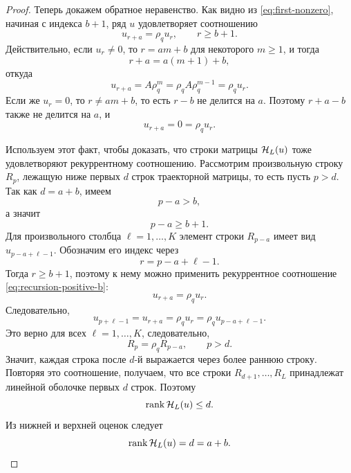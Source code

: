 \begin{proof}
Теперь докажем обратное неравенство. Как видно из \eqref{eq:first-nonzero}, начиная с индекса $b+1$, ряд $u$ удовлетворяет соотношению
\begin{equation}
    u_{r+a}=\rho_q u_r,
    \qquad r\ge b+1.
    \label{eq:recursion-positive-b}
\end{equation}
Действительно, если $u_r\ne0$, то $r=am+b$ для некоторого $m\ge1$, и тогда
\begin{equation*}
    r+a=a(m+1)+b,
\end{equation*}
откуда
\begin{equation*}
    u_{r+a}=A\rho_q^m=\rho_q A\rho_q^{m-1}=\rho_q u_r.
\end{equation*}
Если же $u_r=0$, то $r \ne am+b$, то есть $r-b$ не делится на $a$. Поэтому $r+a-b$ также не делится на $a$, и
\begin{equation*}
    u_{r+a}=0=\rho_q u_r.
\end{equation*}

Используем этот факт, чтобы доказать, что строки матрицы $\mathcal H_L(u)$ тоже
удовлетворяют рекуррентному соотношению. Рассмотрим произвольную строку $R_p$,
лежащую ниже первых $d$ строк траекторной матрицы, то есть пусть $p>d$. Так
как $d=a+b$, имеем
\begin{equation*}
    p-a>b,
\end{equation*}
а значит
\begin{equation*}
    p-a\ge b+1.
\end{equation*}
Для произвольного столбца $\ell=1,\dots,K$ элемент строки $R_{p-a}$ имеет вид $u_{p-a+\ell-1}$. Обозначим его индекс через
\begin{equation*}
    r=p-a+\ell-1.
\end{equation*}
Тогда $r\ge b+1$, поэтому к нему можно применить рекуррентное соотношение \eqref{eq:recursion-positive-b}:
\begin{equation*}
    u_{r+a}=\rho_q u_r.
\end{equation*}
Следовательно,
\begin{equation*}
    u_{p+\ell-1}
    =
    u_{r+a}
    =
    \rho_q u_r
    =
    \rho_q u_{p-a+\ell-1}.
\end{equation*}
Это верно для всех $\ell=1,\dots,K$, следовательно,
\begin{equation*}
    R_p=\rho_q R_{p-a},
    \qquad p>d.
\end{equation*}
Значит, каждая строка после $d$-й выражается через более раннюю строку.
Повторяя это соотношение, получаем, что все строки $R_{d+1},\dots,R_L$
принадлежат линейной оболочке первых $d$ строк.
Поэтому
\begin{equation*}
    \operatorname{rank} \mathcal H_L(u)\le d.
\end{equation*}
Из нижней и верхней оценок следует
\begin{equation}
    \operatorname{rank} \mathcal H_L(u)=d=a+b.
    \label{eq:rank-positive-b}
\end{equation}


\end{proof}
